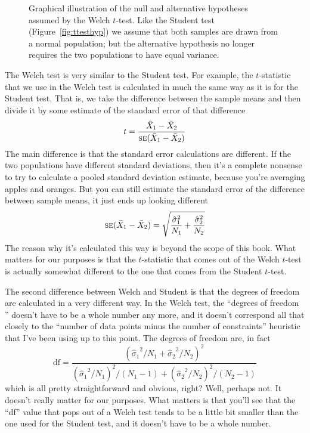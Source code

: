 \begin{figure}
\begin{center}
\caption{Graphical illustration of the null and alternative hypotheses assumed by the Welch $t$-test. Like the Student test (Figure~\ref{fig:ttesthyp}) we assume that both samples are drawn from a normal population; but the alternative hypothesis no longer requires the two populations to have equal variance.}
\HR
\label{fig:ttesthyp2}
\end{center}
\end{figure}

The Welch test is very similar to the Student test. For example, the $t$-statistic that we use in the Welch test is calculated in much the same way as it is for the Student test. That is, we take the difference between the sample means and then divide it by some estimate of the standard error of that difference
$$
t = \frac{\bar{X}_1 - \bar{X}_2}{\mbox{\textsc{se}}(\bar{X}_1 - \bar{X}_2)}
$$
The main difference is that the standard error calculations are different. If the two populations have different standard deviations, then it's a complete nonsense to try to calculate a pooled standard deviation estimate, because you're averaging apples and oranges. But you can still estimate the standard error of the difference between sample means, it just ends up looking different
$$
\mbox{\textsc{se}}(\bar{X}_1 - \bar{X}_2) = \sqrt{ \frac{{\hat{\sigma}_1}^2}{N_1} + \frac{{\hat{\sigma}_2}^2}{N_2} }
$$
The reason why it's calculated this way is beyond the scope of this book. What matters for our purposes is that the $t$-statistic that comes out of the Welch $t$-test is actually somewhat different to the one that comes from the Student $t$-test. 

The second difference between Welch and Student is that the degrees of freedom are calculated in a very different way. In the Welch test, the ``degrees of freedom '' doesn't have to be a whole number any more, and it doesn't correspond all that closely to the ``number of data points minus the number of constraints'' heuristic that I've been using up to this point. The degrees of freedom are, in fact
$$
\mbox{df} = \frac{ ({\hat{\sigma}_1}^2 / N_1 + {\hat{\sigma}_2}^2 / N_2)^2 }{  ({\hat{\sigma}_1}^2 / N_1)^2 / (N_1 -1 )  + ({\hat{\sigma}_2}^2 / N_2)^2 / (N_2 -1 ) } 
$$
which is all pretty straightforward and obvious, right? Well, perhaps not. It doesn't really matter for our purposes. What matters is that you'll see that the ``df'' value that pops out of a Welch test tends to be a little bit smaller than the one used for the Student test, and it doesn't have to be a whole number. 

